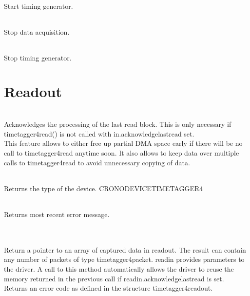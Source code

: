 				\\
				Start timing generator.\par
	
				\\
				Stop data acquisition.\par
	
				\\
				Stop timing generator.\par
	
		\section{Readout\label{cp:readout}}
	
			 \\
			Acknowledges the processing of the last read block. This is only necessary if \textsf{timetagger4\tu read()} is not called with 
			\textsf{in.acknowledge\tu last\tu read} set.\\
			This feature allows to either free up partial DMA space early if there will be no call to \textsf{timetagger4\tu read} anytime soon. 
			It also allows to keep data over multiple calls to \textsf{timetagger4\tu read} to avoid unnecessary copying of data. \par
	
			\\
			Returns the type of the device.	\textsf{CRONO\tu DEVICE\tu TIMETAGGER4}\par
	
			\\
			Returns most recent error message.\par
	
			  \\ \\
			Return a pointer to an array of captured data in \textsf{read\tu out}. 
			The result can contain any number of packets of type \textsf{timetagger4\tu packet}.
			\textsf{read\tu in} provides parameters to the driver. 
			A call to this method automatically allows the driver to reuse the memory returned in the previous call if \textsf{read\tu in.acknowledge\tu last\tu read} is set.\\
			Returns an error code as defined in the structure \textsf{timetagger4\tu read\tu out}.
	
